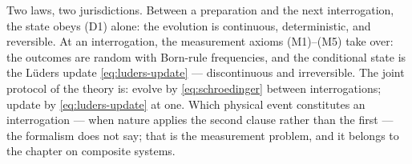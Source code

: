 \begin{note}
Two laws, two jurisdictions. Between a preparation and the next interrogation, the state obeys (D1) alone: the evolution is continuous, deterministic, and reversible. At an interrogation, the measurement axioms (M1)--(M5) take over: the outcomes are random with Born-rule frequencies, and the conditional state is the L\"uders update \eqref{eq:luders-update} --- discontinuous and irreversible. The joint protocol of the theory is: evolve by \eqref{eq:schroedinger} between interrogations; update by \eqref{eq:luders-update} at one. Which physical event constitutes an interrogation --- when nature applies the second clause rather than the first --- the formalism does not say; that is the measurement problem, and it belongs to the chapter on composite systems.
\end{note}

